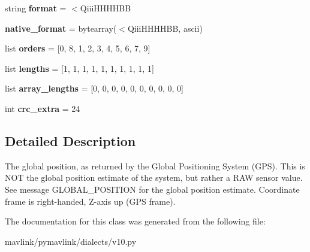 \begin{DoxyCompactItemize}
\item 
\mbox{\label{classpymavlink_1_1dialects_1_1v10_1_1MAVLink__gps__raw__int__message_a3eefaa930d2b9b0e080d25461af8058a}} 
string {\bfseries format} = \textquotesingle{}$<$Qiii\+H\+H\+H\+H\+BB\textquotesingle{}
\item 
\mbox{\label{classpymavlink_1_1dialects_1_1v10_1_1MAVLink__gps__raw__int__message_a45d8dba71600be4211a89d078fa8457d}} 
{\bfseries native\+\_\+format} = bytearray(\textquotesingle{}$<$Qiii\+H\+H\+H\+H\+BB\textquotesingle{}, \textquotesingle{}ascii\textquotesingle{})
\item 
\mbox{\label{classpymavlink_1_1dialects_1_1v10_1_1MAVLink__gps__raw__int__message_a3218d3597385524d049b0c4ad6c0de8a}} 
list {\bfseries orders} = \mbox{[}0, 8, 1, 2, 3, 4, 5, 6, 7, 9\mbox{]}
\item 
\mbox{\label{classpymavlink_1_1dialects_1_1v10_1_1MAVLink__gps__raw__int__message_aa2965b43dfa29dad99c8bbb00a49f517}} 
list {\bfseries lengths} = \mbox{[}1, 1, 1, 1, 1, 1, 1, 1, 1, 1\mbox{]}
\item 
\mbox{\label{classpymavlink_1_1dialects_1_1v10_1_1MAVLink__gps__raw__int__message_a4edcafd7e404fb136ce05ccd77de3758}} 
list {\bfseries array\+\_\+lengths} = \mbox{[}0, 0, 0, 0, 0, 0, 0, 0, 0, 0\mbox{]}
\item 
\mbox{\label{classpymavlink_1_1dialects_1_1v10_1_1MAVLink__gps__raw__int__message_a4e699e6c16ef114a0d8e5bff2b516817}} 
int {\bfseries crc\+\_\+extra} = 24
\end{DoxyCompactItemize}


\subsection{Detailed Description}
\begin{DoxyVerb}The global position, as returned by the Global Positioning
System (GPS). This is                 NOT the global position
estimate of the system, but rather a RAW sensor value. See
message GLOBAL_POSITION for the global position estimate.
Coordinate frame is right-handed, Z-axis up (GPS frame).
\end{DoxyVerb}
 

The documentation for this class was generated from the following file\+:\begin{DoxyCompactItemize}
\item 
mavlink/pymavlink/dialects/v10.\+py\end{DoxyCompactItemize}
